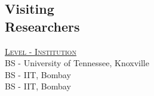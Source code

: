 \documentclass[margin,line]{resume}
\begin{document}
\begin{resume}
    \section{\mysidestyle Visiting\\Researchers}
    \hfill\textsc{\underline{Level - Institution}}\\
    \hfill BS - University of Tennessee, Knoxville\\ 
    \hfill BS - IIT, Bombay \\
    \hfill BS - IIT, Bombay
               \vspace{-2mm}

\end{resume}
\end{document}
